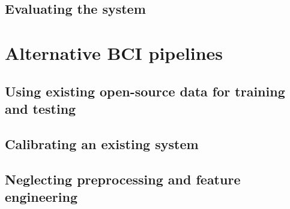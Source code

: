 \lipsum[1-3]


\subsection{Evaluating the system}
\label{subsec:processing_signals_general_pipeline_evaluating}


\lipsum[1-6]



\section{Alternative BCI pipelines}
\label{sec:processing_signals_alternative_pipelines}


\subsection{Using existing open-source data for training and testing}
\label{subsec:processing_signals_alternative_pipelines_using_existing_data}

\lipsum[1-3]


\subsection{Calibrating an existing system}
\label{subsec:processing_signals_alternative_calibration}


\lipsum[1-3]


\subsection{Neglecting preprocessing and feature engineering}
\label{subsec:processing_signals_alternative_pipelines_no_preprocessing_and_features}

\lipsum[1-2]

